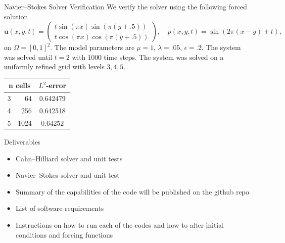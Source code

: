 \documentclass[9pt]{beamer}
\newcommand{\eps}{\epsilon}
\begin{document}
\begin{frame}{Navier--Stokes Solver Verification}
	We verify the solver using the following forced solution
	$$
		\mathbf{u}(x,y,t) = \begin{pmatrix}
		t\sin(\pi x)\sin(\pi(y + .5))\\
		t\cos(\pi x)\cos(\pi(y + .5))
		\end{pmatrix}, \quad p(x,y,t) = \sin(2\pi(x - y) + t),
	$$
	on $\Omega = [0,1]^2$.
	The model parameters are $\mu = 1$, $\lambda = .05$, $\eps = .2$. The system was solved until $t=2$ with 1000 time steps. The system was solved on a uniformly refined grid with levels $3, 4, 5$. 
	
	\begin{table}[H]
		\begin{center}
			\begin{tabular}{|c|r|c|} \hline
				
				\multicolumn{2}{|c|}{n cells} &  
				\multicolumn{1}{|c|}{$L^2$-error}\\ \hline
				3 & 64 & 0.642479 \\ \hline
				4 & 256 & 0.642518\\ \hline
				5 & 1024 &  0.64252\\ \hline
			\end{tabular}
		\end{center}
	\end{table}
\end{frame}

\begin{frame}{Deliverables}
	\begin{itemize}
		\item Cahn--Hilliard solver and unit tests
		\item Navier--Stokes solver and unit test
		\item Summary of the capabilities of the code will be published on the github repo
		\item List of software requirements
		\item Instructions on how to run each of the codes and how to alter initial conditions and forcing functions
	\end{itemize}
\end{frame}
\end{document}
